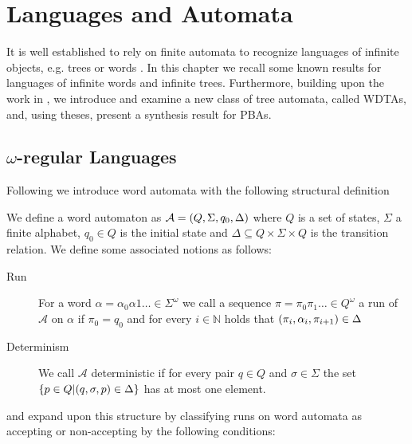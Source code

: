 \chapter{Languages and Automata}
It is well established to rely on finite automata to recognize languages of
infinite objects, e.g. trees or words \cite{LangAutoLog}. In this chapter we
recall some known results for languages of infinite words and infinite trees.
Furthermore, building upon the work in \cite{RandAutoInfTrees}, we introduce and
examine a new class of tree automata, called \aclp*{WDTA}, and, using theses,
present a synthesis result for \aclp*{PBA}.

\section{$\omega$-regular Languages}
Following \cite{LangAutoLog} we introduce word automata with the following
structural definition
\begin{definition}
  We define a word automaton as
  $\mathcal{A} = \left(Q, \Sigma, q_{0}, \Delta\right)$ where
  $Q$ is a set of states, $\Sigma$ a finite alphabet, $q_{0}\in Q$ is the
  initial state and $\Delta\subseteq Q\times\Sigma\times Q$ is the transition
  relation. We define some associated notions as follows:
  \begin{description}
    \item [Run]
      For a word $\alpha = \alpha_{0}\alpha{1}\dots\in\Sigma^{\omega}$ we call
      a sequence $\pi = \pi_{0}\pi_{1}\dots \in Q^{\omega}$ a run of
      $\mathcal{A}$ on $\alpha$ if $\pi_{0} = q_{0}$ and for every
      $i\in\mathbb{N}$ holds that
      $\left(\pi_{i}, \alpha_{i}, \pi_{i+1}\right)\in\Delta$
    \item [Determinism]
      We call $\mathcal{A}$ deterministic if for every pair $q\in Q$ and
      $\sigma\in\Sigma$ the set
      $\left\{p\in Q\middle| \left(q,\sigma,p\right)\in\Delta\right\}$ has at most one
      element.
  \end{description}
\end{definition}
and expand upon this structure by classifying runs on word automata as
accepting or non-accepting by the following conditions:
